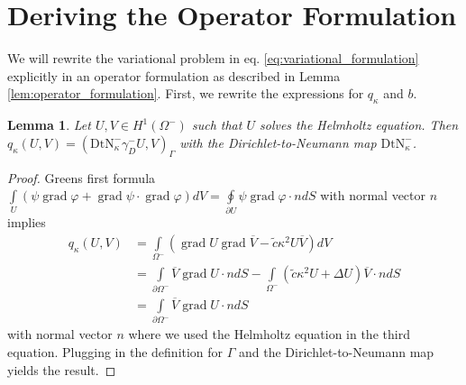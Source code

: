 \documentclass[12pt,journal,compsoc, onecolumn]{IEEEtran}
\newtheorem{lemma}[theorem]{Lemma}
\begin{document}
\section{Deriving the Operator Formulation}
\label{section:operator_formulation}
We will rewrite the  variational problem in eq. \ref{eq:variational_formulation} explicitly in an  operator formulation as described in Lemma \ref{lem:operator_formulation}. 
First, we rewrite the expressions for $q_\kappa$ and $b$. 
\begin{lemma}\label{lem:reduced_q}
    Let $U, V \in H^{1}(\Omega^-)$ such that $U$ solves the Helmholtz equation. 
    Then $q_\kappa(U, V) = (\mathrm{DtN}_{ \kappa}^{-}\gamma_D^-U, V)_{\Gamma}$ with the
     Dirichlet-to-Neumann map $\mathrm{DtN}_{ \kappa}^{-}$.
\end{lemma}
\begin{proof}
    Greens first formula 
    \(\int\limits_{U}(\psi \operatorname{grad} \varphi+\operatorname{grad} \psi \cdot \operatorname{grad} \varphi) dV=
    \oint\limits_{\partial U} \psi \operatorname{grad} \varphi \cdot n dS\) with normal vector $n$
    implies 
\begin{align}
    q_\kappa(U, V) &= \int\limits_{\Omega^-} ( \operatorname{grad} U \operatorname{grad} \overline{V} -  \tilde c\kappa^2U \overline{V})dV \nonumber \\
    &= \int\limits_{ \partial \Omega^-} \overline{V} \operatorname{grad} U \cdot nd {S} - \int\limits_{\Omega^{-}} {( \tilde c\kappa^2 U + \Delta U)}\overline{V} \cdot nd{S}  \nonumber  \\
    &= \int\limits_{ \partial \Omega^-} \overline{V} \operatorname{grad} U \cdot nd {S} \nonumber
\end{align}
 with normal vector $n$ where we used the Helmholtz equation in the third equation.
 Plugging in the definition for $\Gamma$ and the Dirichlet-to-Neumann map yields the result.
\end{proof}  \noindent
\end{document}
